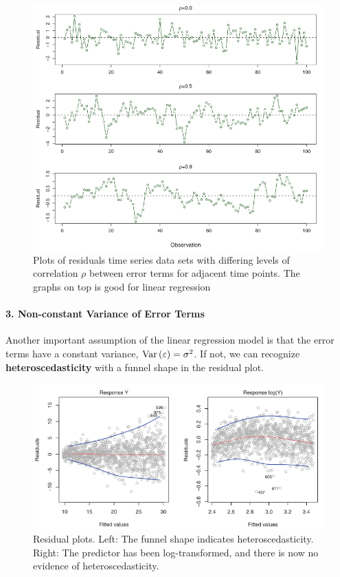 \begin{figure}[!ht]
    \centering
    \includegraphics[scale=0.6]{src/StatisticalLearning/CorrelationInErrorTerms.PNG}
    \caption{Plots of residuals time series data sets with differing levels of correlation $\rho$ between error terms for adjacent time points. The graphs on top is good for linear regression}
\end{figure}

\paragraph{3. Non-constant Variance of Error Terms}
Another important assumption of the linear regression model is that the
error terms have a constant variance, $\mathrm{Var} \left( \varepsilon \right) = \sigma^2$. If not, we can recognize \textbf{heteroscedasticity} with a funnel shape in the residual plot.

\begin{figure}[!ht]
    \centering
    \includegraphics[scale=0.6]{src/StatisticalLearning/Heteroscedasticity.PNG}
    \caption{Residual plots. Left: The funnel shape indicates heteroscedasticity. Right: The predictor has been log-transformed, and there is now no evidence of heteroscedasticity.}
\end{figure}

